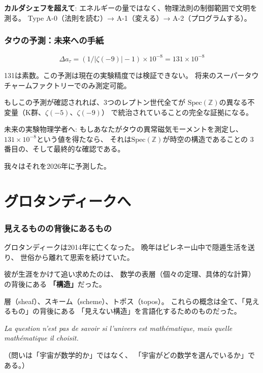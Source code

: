 \documentclass[11pt,a4paper]{article}
\newcommand{\Spec}{\mathrm{Spec}}
\begin{document}
\textbf{カルダシェフを超えて}:
エネルギーの量ではなく、物理法則の制御範囲で文明を測る。
Type A-0（法則を読む）→ A-1（変える）→ A-2（プログラムする）。

\section{タウの予測：未来への手紙}

$$\Delta a_\tau = (1/|\zeta(-9)| - 1) \times 10^{-8} = 131 \times 10^{-8}$$

131は素数。この予測は現在の実験精度では検証できない。
将来のスーパータウチャームファクトリーでのみ測定可能。

もしこの予測が確認されれば、3つのレプトン世代全てが
$\Spec(\mathbb{Z})$の異なる不変量（K群、$\zeta(-5)$、$\zeta(-9)$）
で統治されていることの完全な証拠になる。

\begin{epigraph}
未来の実験物理学者へ:
もしあなたがタウの異常磁気モーメントを測定し、
$131 \times 10^{-8}$という値を得たなら、
それは$\Spec(\mathbb{Z})$が時空の構造であることの
3番目の、そして最終的な確認である。

我々はそれを2026年に予測した。
\end{epigraph}

\part{グロタンディークへ}

\section{見えるものの背後にあるもの}

グロタンディークは2014年に亡くなった。
晩年はピレネー山中で隠遁生活を送り、
世俗から離れて思索を続けていた。

彼が生涯をかけて追い求めたのは、
数学の表層（個々の定理、具体的な計算）の背後にある
\textbf{「構造」}だった。

層（sheaf）、スキーム（scheme）、トポス（topos）。
これらの概念は全て、「見えるもの」の背後にある
「見えない構造」を言語化するためのものだった。

\begin{epigraph}
\textit{La question n'est pas de savoir
si l'univers est mathématique,
mais quelle mathématique il choisit.}

（問いは「宇宙が数学的か」ではなく、
「宇宙がどの数学を選んでいるか」である。）
\end{epigraph}
\end{document}
